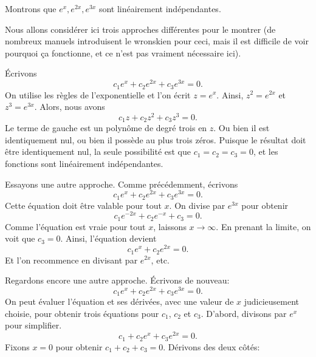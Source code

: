 \begin{example}
	Montrons que $e^x, e^{2x}, e^{3x}$ sont linéairement indépendantes.
	
	Nous allons considérer ici trois approches différentes pour le montrer 
	(de nombreux manuels introduisent le wronskien pour ceci, 
	mais il est difficile de voir pourquoi ça fonctionne, et ce n'est pas vraiment nécessaire ici).
	
	Écrivons
	\begin{equation*}
		c_1 e^x + c_2 e^{2x} + c_3 e^{3x} = 0.
	\end{equation*}
	On utilise les règles de l'exponentielle et l'on écrit $z = e^x$.  
	Ainsi, $z^2 = e^{2x}$ et $z^3 = e^{3x}$.  
	Alors, nous avons
	\begin{equation*}
		c_1 z + c_2 z^2 + c_3 z^3 = 0.
	\end{equation*}
	Le terme de gauche est un polynôme de degré trois en $z$.
	Ou bien il est identiquement nul, ou bien il possède au plus trois zéros. 
	Puisque le résultat doit être identiquement nul, la seule possibilité est que 
	$c_1 = c_2 = c_3 = 0$, et les fonctions sont linéairement indépendantes. 
	
	Essayons une autre approche. Comme précédemment, écrivons 
	\begin{equation*}
		c_1 e^x + c_2 e^{2x} + c_3 e^{3x} = 0.
	\end{equation*}
	Cette équation doit être valable pour tout $x$.  On divise par  $e^{3x}$ pour obtenir
	\begin{equation*}
		c_1 e^{-2x} + c_2 e^{-x} + c_3 = 0.
	\end{equation*}
	Comme l'équation est vraie pour tout $x$, laissons $x \to \infty$.  En prenant la limite, on voit que $c_3 = 0$.  Ainsi, l'équation devient 
	\begin{equation*}
		c_1 e^x + c_2 e^{2x} = 0.
	\end{equation*}
	Et l'on recommence en divisant par $e^{2x}$, etc.
	
	Regardons encore une autre approche. Écrivons de nouveau:  
	\begin{equation*}
		c_1 e^x + c_2 e^{2x} + c_3 e^{3x} = 0.
	\end{equation*}
	On peut évaluer l'équation et ses dérivées, avec une valeur de $x$ judicieusement choisie, pour obtenir trois équations pour 
	$c_1$, $c_2$ et $c_3$.
	D'abord, divisons par $e^{x}$ pour simplifier.
	\begin{equation*}
		c_1 + c_2 e^{x} + c_3 e^{2x} = 0.
	\end{equation*}
	Fixons $x=0$ pour obtenir $c_1 + c_2 + c_3 = 0$.  Dérivons des deux côtés: 
	

\end{example}
